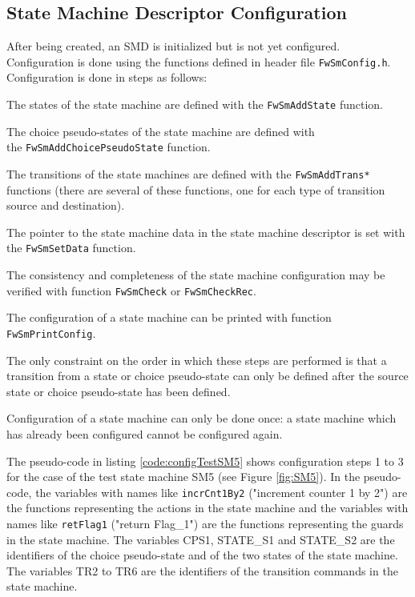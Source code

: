 \documentclass[a4paper,10pt]{article}
\newenvironment{fw_enumerate}					%
{\begin{enumerate}
  \setlength{\itemsep}{1mm}
  \setlength{\parskip}{0pt}
  \setlength{\parsep}{0pt}}
{\end{enumerate}}
\begin{document}
\subsection{State Machine Descriptor Configuration}\label{sec:smConfig}
After being created, an SMD is initialized but is not yet configured. Configuration is done using the functions defined 
in header file \texttt{FwSmConfig.h}. Configuration is done in steps as follows:

\begin{fw_enumerate}
\item The states of the state machine are defined with the \texttt{FwSmAddState} function.  
\item The choice pseudo-states of the state machine are defined with \\ the \texttt{FwSmAddChoicePseudoState} function.
\item The transitions of the state machines are defined with the \texttt{FwSmAddTrans*} functions (there are several 
of these functions, one for each type of transition source and destination).
\item The pointer to the state machine data in the state machine descriptor is set with the \texttt{FwSmSetData} function.
\item The consistency and completeness of the state machine configuration may be verified with function \texttt{FwSmCheck} or \texttt{FwSmCheckRec}. 
\item The configuration of a state machine can be printed with function \\ \texttt{FwSmPrintConfig}.
\end{fw_enumerate}

The only constraint on the order in which these steps are performed is that a transition from a state or 
choice pseudo-state can only be defined after the source state or choice pseudo-state has been defined. 

Configuration of a state machine can only be done once: a state machine which has already been configured 
cannot be configured again.

The pseudo-code in listing \ref{code:configTestSM5} shows configuration steps 1 to 3 for the case of the test state machine SM5 
(see Figure \ref{fig:SM5}). In the pseudo-code, the variables with names like \texttt{incrCnt1By2} ("increment 
counter 1 by 2") are the functions representing the actions in the state machine and the variables with names 
like \texttt{retFlag1} ("return Flag\_1") are the functions representing the guards in the state machine.
The variables CPS1, STATE\_S1 and STATE\_S2 are the identifiers of the choice pseudo-state and of the two
states of the state machine. The variables TR2 to TR6 are the identifiers of the transition commands in the state 
machine.
\end{document}
